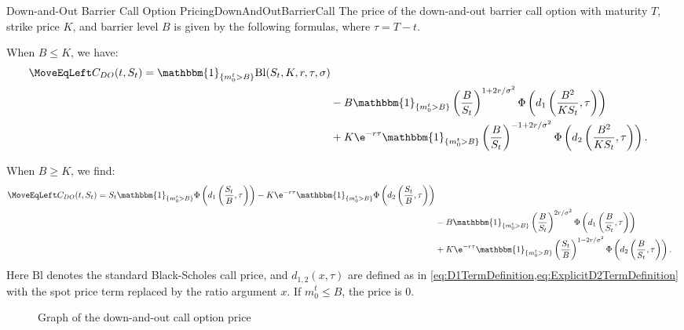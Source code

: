 \begin{prop}{Down-and-Out Barrier Call Option Pricing}{DownAndOutBarrierCall}
	The price of the down-and-out barrier call option with maturity $T$, strike price $K$, and barrier level $B$ is given by the following formulas, where $\tau = T-t$.

	When $B \le K$, we have:
	\begin{align}
		\MoveEqLeft C_{DO}(t, S_t) = \mathbbm{1}_{\{m_0^t > B\}} \mathrm{Bl}(S_t, K, r, \tau, \sigma) \nonumber                                                      \\
		 & - B \mathbbm{1}_{\{m_0^t > B\}} \left( \frac{B}{S_t} \right)^{1+2r/\sigma^2} \Phi \left( d_1 \left( \frac{B^2}{K S_t}, \tau \right) \right) \nonumber     \\
		 & + K \e^{-r\tau} \mathbbm{1}_{\{m_0^t > B\}} \left( \frac{B}{S_t} \right)^{-1+2r/\sigma^2} \Phi \left( d_2 \left( \frac{B^2}{K S_t}, \tau \right) \right).
	\end{align}

	When $B \ge K$, we find:
	\begin{align}
		\MoveEqLeft C_{DO}(t, S_t) = S_t \mathbbm{1}_{\{m_0^t > B\}} \Phi \left( d_1 \left( \frac{S_t}{B}, \tau \right) \right) - K \e^{-r\tau} \mathbbm{1}_{\{m_0^t > B\}} \Phi \left( d_2 \left( \frac{S_t}{B}, \tau \right) \right) \nonumber \\
		 & - B \mathbbm{1}_{\{m_0^t > B\}} \left( \frac{B}{S_t} \right)^{2r/\sigma^2} \Phi \left( d_1 \left( \frac{B}{S_t}, \tau \right) \right) \nonumber                                                                                       \\
		 & + K \e^{-r\tau} \mathbbm{1}_{\{m_0^t > B\}} \left( \frac{S_t}{B} \right)^{1-2r/\sigma^2} \Phi \left( d_2 \left( \frac{B}{S_t}, \tau \right) \right).
	\end{align}
	Here $\mathrm{Bl}$ denotes the standard Black-Scholes call price, and $d_{1,2}(x, \tau)$ are defined as in \cref{eq:D1TermDefinition,eq:ExplicitD2TermDefinition} with the spot price term replaced by the ratio argument $x$. If $m_0^t \le B$, the price is $0$.
\end{prop}


\begin{figure}[H]
	\centering
	
	\caption{Graph of the down-and-out call option price}
	\label{fig:downAndOutCallBarrierSurface}
\end{figure}

\clearpage
